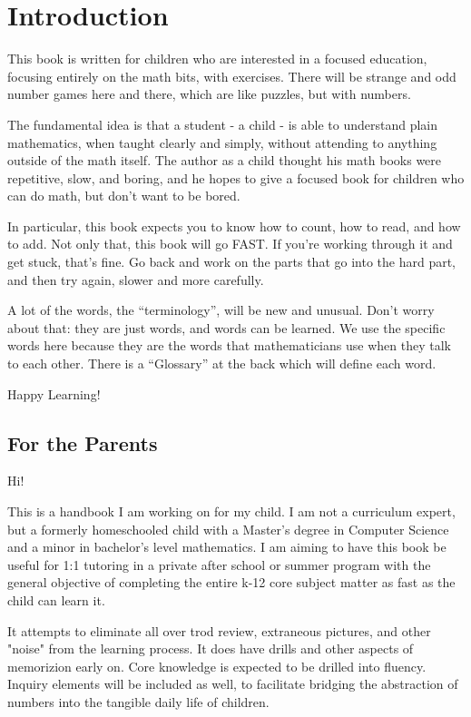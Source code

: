 

\chapter{Introduction}

This book is written for children who are interested in a focused education, focusing entirely on the math bits,
with exercises.  There will be strange and odd number games here and there, which are like puzzles, but with numbers.

The fundamental idea is that a student - a child - is able to understand plain mathematics, when taught clearly and
simply, without  attending to anything outside of the math itself. The author as a child thought his math books were
repetitive, slow, and boring, and he hopes to give a focused book for children who can do math, but don't want to be bored.

In particular, this book expects you to know how to count, how to read, and how to add. Not only that, this book will go FAST. If you're working through it and get stuck, that's fine. Go back and work on the parts that go into the hard part, and then try again, slower and more carefully.

A lot of the words, the ``terminology'', will be new and unusual.  Don't worry about that: they are just words, and words
can be learned.  We use the specific words here because they are the words that mathematicians use when they talk to
each other. There is a ``Glossary'' at the back which will define each word.

Happy Learning!

\section{For the Parents}

Hi!

This is a handbook I am working on for my child. I am not a curriculum expert, but a formerly homeschooled child with a Master's degree in Computer Science and a minor in bachelor's level mathematics. I am aiming to have this book be useful for 1:1 tutoring in a private after school or summer program with the general objective of completing the entire k-12 core subject matter as fast as the child can learn it. 

It attempts to eliminate all over trod review, extraneous pictures, and other "noise" from the learning process. It does have drills and other aspects of memorizion early on. Core knowledge is expected to be drilled into fluency. Inquiry elements will be included as well, to facilitate bridging the abstraction of numbers into the tangible daily life of children. 

